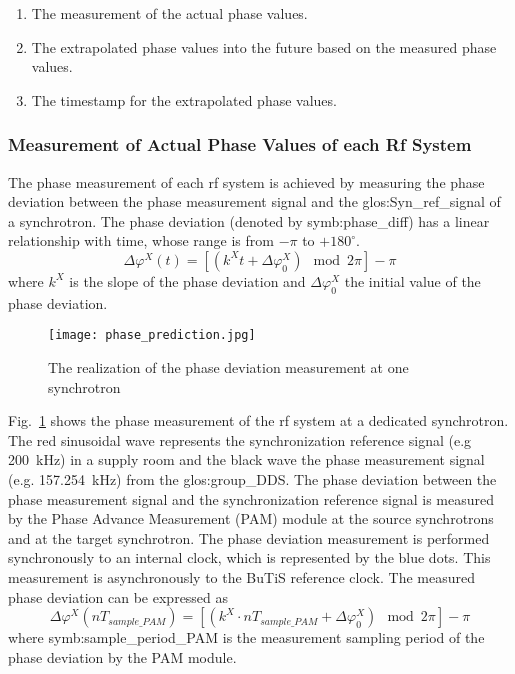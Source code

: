 \begin{enumerate}
\item The measurement of the actual phase values.
\item The extrapolated phase values into the future based on the measured phase values.
\item The timestamp for the extrapolated phase values.
\end{enumerate}


 \subsubsection{Measurement of Actual Phase Values of each Rf System}
The phase measurement of each rf system is achieved by measuring the phase deviation between the phase measurement signal and the \gls{glos:Syn_ref_signal} of a synchrotron. The phase deviation (denoted by \gls{symb:phase_diff}) has a linear relationship with time, whose range is from $-\pi$ to $+180^\circ$. 
\begin{equation}
\Delta \varphi^X(t)= [(k^\mathit{X}t+\Delta \varphi^X_0) \mod 2\pi] - \pi
\end{equation}
where $k^\mathit{X}$ is the slope of the phase deviation and $\Delta \varphi^X_0$ the initial value of the phase deviation.



\begin{figure}[!htb]
   \centering   
   \texttt{[image: phase\_prediction.jpg]}
   \caption{The realization of the phase deviation measurement at one synchrotron}
   \label{phase_prediction}
\end{figure}

Fig.~\ref{phase_prediction} shows the phase measurement of the rf system at a dedicated synchrotron. The red sinusoidal wave represents the synchronization reference signal (e.g \SI{200}{kHz}) in a supply room and the black wave the phase measurement signal (e.g. \SI{157.254}{kHz}) from the \gls{glos:group_DDS}. The phase deviation between the phase measurement signal and the synchronization reference signal is measured by the Phase Advance Measurement (\gls{PAM}) module at the source synchrotrons and at the target synchrotron. The phase deviation measurement is performed synchronously to an internal clock, which is represented by the blue dots. This measurement is asynchronously to the BuTiS reference clock. The measured phase deviation can be expressed as
\begin{equation}
\Delta \varphi^X(nT_\mathit{sample\_PAM})=[( k^\mathit{X}\cdot nT_\mathit{sample\_PAM}+\Delta \varphi^X_0) \mod 2\pi ]-\pi
\end{equation}
where \gls{symb:sample_period_PAM} is the measurement sampling period of the phase deviation by the PAM module.

